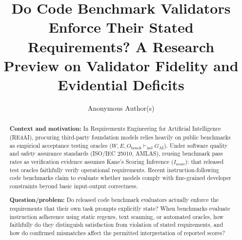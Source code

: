 \documentclass[runningheads]{llncs}
\begin{document}
\title{Do Code Benchmark Validators Enforce Their Stated Requirements? A Research Preview on Validator Fidelity and Evidential Deficits}

\author{Anonymous Author(s)}


\maketitle

\begin{abstract}
\textbf{Context and motivation:} In Requirements Engineering for Artificial Intelligence (RE4AI), procuring third-party foundation models relies heavily on public benchmarks as empirical acceptance testing oracles ($W, E, O_{\text{bench}} \vdash_{\text{ind}} G_{\text{AI}}$). Under software quality and safety assurance standards (ISO/IEC 25010, AMLAS), reusing benchmark pass rates as verification evidence assumes Kane's Scoring Inference ($I_{\text{score}}$): that released test oracles faithfully verify operational requirements. Recent instruction-following code benchmarks claim to evaluate whether models comply with fine-grained developer constraints beyond basic input-output correctness.

\textbf{Question/problem:} Do released code benchmark evaluators actually enforce the requirements that their own task prompts explicitly state? When benchmarks evaluate instruction adherence using static regexes, text scanning, or automated oracles, how faithfully do they distinguish satisfaction from violation of stated requirements, and how do confirmed mismatches affect the permitted interpretation of reported scores?


\end{abstract}
\end{document}
